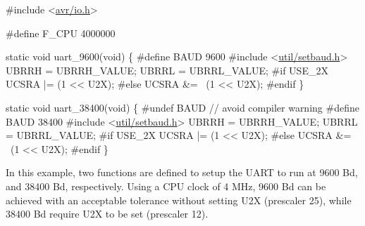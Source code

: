 \begin{DoxyCode}
\textcolor{preprocessor}{#include <\hyperlink{io_8h}{avr/io.h}>}

\textcolor{preprocessor}{#define F\_CPU 4000000}

\textcolor{keyword}{static} \textcolor{keywordtype}{void}
uart\_9600(\textcolor{keywordtype}{void})
\{
\textcolor{preprocessor}{#define BAUD 9600}
\textcolor{preprocessor}{#include <\hyperlink{setbaud_8h}{util/setbaud.h}>}
UBRRH = UBRRH\_VALUE;
UBRRL = UBRRL\_VALUE;
\textcolor{preprocessor}{#if USE\_2X}
UCSRA |= (1 << U2X);
\textcolor{preprocessor}{#else}
UCSRA &= ~(1 << U2X);
\textcolor{preprocessor}{#endif}
\}

\textcolor{keyword}{static} \textcolor{keywordtype}{void}
uart\_38400(\textcolor{keywordtype}{void})
\{
\textcolor{preprocessor}{#undef BAUD  // avoid compiler warning}
\textcolor{preprocessor}{#define BAUD 38400}
\textcolor{preprocessor}{#include <\hyperlink{setbaud_8h}{util/setbaud.h}>}
UBRRH = UBRRH\_VALUE;
UBRRL = UBRRL\_VALUE;
\textcolor{preprocessor}{#if USE\_2X}
UCSRA |= (1 << U2X);
\textcolor{preprocessor}{#else}
UCSRA &= ~(1 << U2X);
\textcolor{preprocessor}{#endif}
\textcolor{preprocessor}{\}}
\end{DoxyCode}


In this example, two functions are defined to setup the U\+A\+RT to run at 9600 Bd, and 38400 Bd, respectively. Using a C\+PU clock of 4 M\+Hz, 9600 Bd can be achieved with an acceptable tolerance without setting U2X (prescaler 25), while 38400 Bd require U2X to be set (prescaler 12). 
